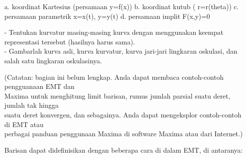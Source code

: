 \documentclass[12pt,arial,letterpaper]{book}
\begin{document}
\begin{eulernootebook}
\begin{eulercomment}
\begin{eulercomment}
\begin{eulernootebook}
\begin{eulercomment}
\begin{eulercomment}
\begin{eulercomment}
\begin{eulercomment}
\begin{eulercomment}
\begin{eulercomment}
\begin{eulernotebook}
\begin{eulercomment}
\begin{eulercomment}
\begin{eulercomment}
\begin{eulercomment}
\begin{eulercomment}
\begin{eulercomment}
\begin{eulercomment}
\begin{eulercomment}
\begin{eulercomment}
\begin{eulercomment}
\begin{eulercomment}
\begin{eulercomment}
\begin{eulercomment}
\begin{eulercomment}
\begin{eulercomment}
\begin{eulercomment}
\begin{eulercomment}
\begin{eulercomment}
\begin{eulercomment}
\begin{eulercomment}
\begin{eulercomment}
\begin{eulercomment}
\begin{eulercomment}
\end{eulercomment}
\begin{eulerttcomment}
  a. koordinat Kartesius (persamaan y=f(x))
  b. koordinat kutub ( r=r(theta))
  c. persamaan parametrik x=x(t), y=y(t)
  d. persamaan implit F(x,y)=0
\end{eulerttcomment}
\begin{eulercomment}

- Tentukan kurvatur masing-masing kurva dengan menggunakan keempat
representasi tersebut (hasilnya harus sama).\\
- Gambarlah kurva asli, kurva kurvatur, kurva jari-jari lingkaran
oskulasi, dan salah satu lingkaran oskulasinya.


\begin{eulercomment}
\begin{eulercomment}
(Catatan: bagian ini belum lengkap. Anda dapat membaca contoh-contoh
pengguanaan EMT dan\\
Maxima untuk menghitung limit barisan, rumus jumlah parsial suatu
deret, jumlah tak hingga\\
suatu deret konvergen, dan sebagainya. Anda dapat mengeksplor
contoh-contoh di EMT atau\\
perbagai panduan penggunaan Maxima di software Maxima atau dari
Internet.)

Barisan dapat didefinisikan dengan beberapa cara di dalam EMT, di
antaranya:


\end{eulercomment}
\end{eulercomment}
\end{eulercomment}
\end{eulercomment}
\end{eulercomment}
\end{eulercomment}
\end{eulercomment}
\end{eulercomment}
\end{eulercomment}
\end{eulercomment}
\end{eulercomment}
\end{eulercomment}
\end{eulercomment}
\end{eulercomment}
\end{eulercomment}
\end{eulercomment}
\end{eulercomment}
\end{eulercomment}
\end{eulercomment}
\end{eulercomment}
\end{eulercomment}
\end{eulercomment}
\end{eulercomment}
\end{eulercomment}
\end{eulercomment}
\end{eulernotebook}
\end{eulercomment}
\end{eulercomment}
\end{eulercomment}
\end{eulercomment}
\end{eulercomment}
\end{eulercomment}
\end{eulernootebook}
\end{eulercomment}
\end{eulercomment}
\end{eulernootebook}
\end{document}
